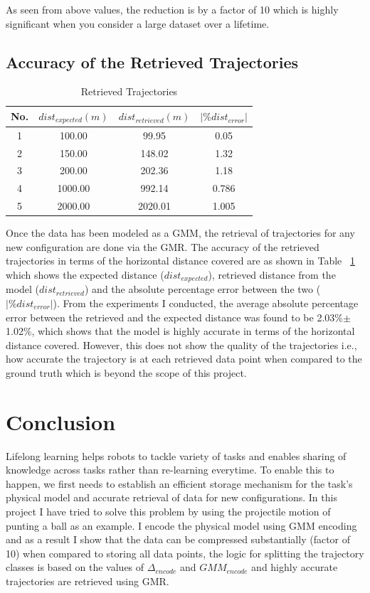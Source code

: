 \documentclass[conference]{IEEEtran}
\begin{document}
As seen from above values, the reduction is by a factor of 10 which is highly significant when you consider a large dataset over a lifetime.

\subsection{Accuracy of the Retrieved Trajectories}
\begin{table}[t]\renewcommand{\arraystretch}{1.5}\addtolength{\tabcolsep}{-1pt}
\centering
\caption{Retrieved Trajectories}
\begin{tabular}{  | c | c | c | c |}
  \hline
  No. & $dist_{expected} (m)$ & $dist_{retrieved} (m)$ & $|\% dist_{error}|$\\
  \hline 
  1 & 100.00 & 99.95 & 0.05\\
  2 & 150.00 & 148.02 & 1.32\\
  3 & 200.00 & 202.36 & 1.18\\
  4 & 1000.00 & 992.14 & 0.786\\
  5 & 2000.00 & 2020.01 & 1.005\\
  \hline
\end{tabular}
\label{tab:tab2}
\end{table}

Once the data has been modeled as a GMM, the retrieval of trajectories for any new configuration are done via the GMR. The accuracy of the retrieved trajectories in terms of the horizontal distance covered are as shown in Table ~\ref{tab:tab2} which shows the expected distance ($dist_{expected}$), retrieved distance from the model ($dist_{retrieved}$) and the absolute percentage error between the two ($|\% dist_{error}|$). From the experiments I conducted, the average absolute percentage error between the retrieved and the expected distance was found to be 2.03\%$\pm$1.02\%, which shows that the model is highly accurate in terms of the horizontal distance covered. However, this does not show the quality of the trajectories i.e., how accurate the trajectory is at each retrieved data point when compared to the ground truth which is beyond the scope of this project. 

\section{Conclusion}
Lifelong learning helps robots to tackle variety of tasks and enables sharing of knowledge across tasks rather than re-learning everytime. To enable this to happen, we first needs to establish an efficient storage mechanism for the task's physical model and accurate retrieval of data for new configurations. In this project I have tried to solve this problem by using the projectile motion of punting a ball as an example. I encode the physical model using GMM encoding and as a result I show that the data can be compressed substantially (factor of 10) when compared to storing all data points, the logic for splitting the trajectory classes is based on the values of $\Delta_{encode}$ and $GMM_{encode}$ and highly accurate trajectories are retrieved using GMR.
\end{document}

